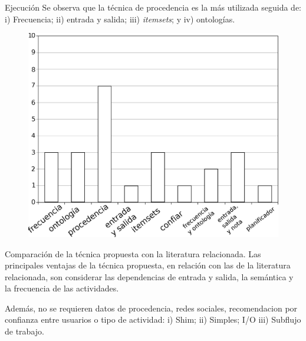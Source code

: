 \begin{frame}		
	\begin{block}{Ejecución}
		Se observa que la técnica de procedencia es la más utilizada seguida de: i) Frecuencia; ii) entrada y salida; iii) \emph{itemsets}; y iv) ontologías.
		\begin{figure}
			\begin{minipage}[b]{0.5\textwidth}
				\includegraphics[width=\textwidth]{./secoes/RevisaoDaLiteratura/GraficoQuantidadeTecnica.eps}
			\end{minipage}
		\end{figure}
		
	\end{block}
\end{frame}

\begin{frame}		
	\begin{block}{Comparación de la técnica propuesta con la literatura relacionada.}
		Las principales ventajas de la técnica propuesta, en relación con las de la literatura relacionada, son considerar las dependencias de entrada y salida, la semántica y la frecuencia de las actividades. 
		
		Además, no se requieren datos de procedencia, redes sociales, recomendacion por confianza entre usuarios o tipo de actividad: i) Shim; ii) Simples; I/O iii) Subflujo de trabajo.
	\end{block}
\end{frame}


